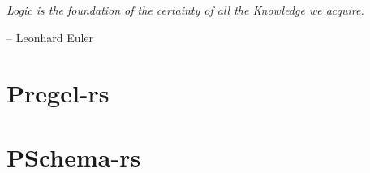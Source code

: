 \epigraph{\textit{Logic is the foundation of the certainty of all the Knowledge we acquire.}}{-- \textup{Leonhard Euler}}

\section{Pregel-rs}

\section{PSchema-rs}